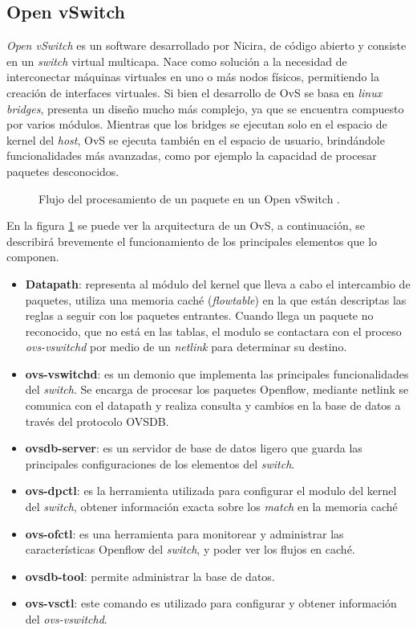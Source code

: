 \subsection{Open vSwitch}
\label{subs:ovs}
\textit{Open vSwitch} es un software desarrollado por Nicira, de código abierto y consiste en un \textit{switch} virtual multicapa. Nace como solución a la necesidad de interconectar máquinas virtuales en uno o más nodos físicos, permitiendo la creación de interfaces virtuales. Si bien el desarrollo de OvS se basa en \textit{linux bridges}, presenta un diseño mucho más complejo, ya que se encuentra compuesto por varios módulos. Mientras que los bridges se ejecutan solo en el espacio de kernel del \textit{host}, OvS se ejecuta también en el espacio de usuario, brindándole funcionalidades más avanzadas, como por ejemplo la capacidad de procesar paquetes desconocidos.

\begin{figure}[th]
	\centering 
	\caption[Flujo del procesamiento de un paquete en un Open vSwitch]{Flujo del procesamiento de un paquete en un Open vSwitch \parencite{ovsflow}.}
	\label{fig:ovs}
\end{figure}

En la figura \ref{fig:ovs} se puede ver la arquitectura de un OvS, a continuación, se describirá brevemente el funcionamiento de los principales elementos que lo componen.
\begin{itemize}
	\item \textbf{Datapath}: representa al módulo del kernel que lleva a cabo el intercambio de paquetes, utiliza una memoria caché (\textit{flowtable}) en la que están descriptas las reglas a seguir con los paquetes entrantes. Cuando llega un paquete no reconocido, que no está en las tablas, el modulo se contactara con el proceso \textit{ovs-vswitchd} por medio de un \textit{netlink} para determinar su destino.
	\item \textbf{ovs-vswitchd}: es un demonio que implementa las principales funcionalidades del \textit{switch}. Se encarga de procesar los paquetes Openflow, mediante netlink se comunica con el datapath y realiza consulta y cambios en la base de datos a través del protocolo OVSDB.
	\item \textbf{ovsdb-server}: es un servidor de base de datos ligero que guarda las principales configuraciones de los elementos del \textit{switch}.
	\item \textbf{ovs-dpctl}: es la herramienta utilizada para configurar el modulo del kernel del \textit{switch}, obtener información exacta sobre los \textit{match} en la memoria caché
	\item \textbf{ovs-ofctl}: es una herramienta para monitorear y administrar las características Openflow del \textit{switch}, y poder ver los flujos en caché.
	\item \textbf{ovsdb-tool}: permite administrar la base de datos.
	\item \textbf{ovs-vsctl}: este comando es utilizado para configurar y obtener información del \textit{ovs-vswitchd}.
\end{itemize}

